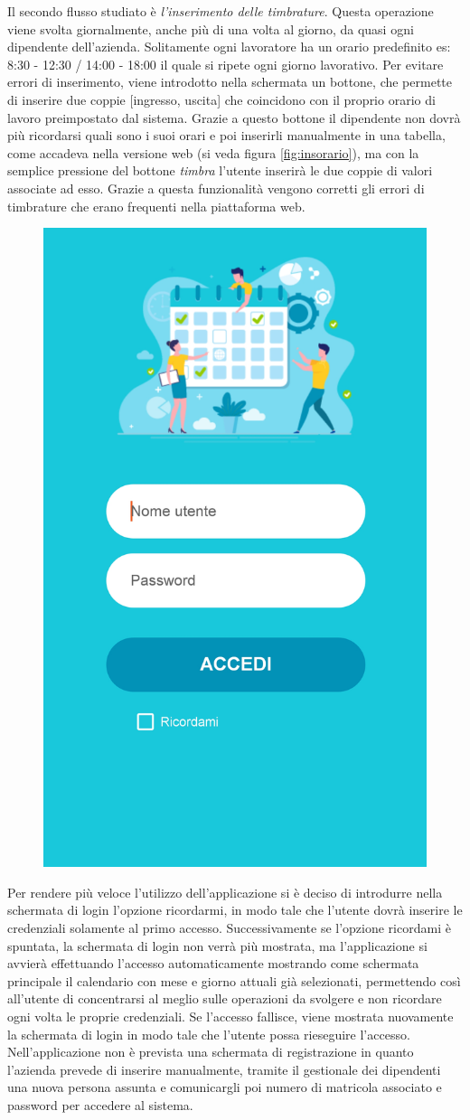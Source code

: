 \documentclass[12pt]{report}
\begin{document}
Il secondo flusso studiato è \textit{l'inserimento delle timbrature}. Questa operazione viene svolta giornalmente, anche più di una volta al giorno, da quasi ogni dipendente dell'azienda. Solitamente ogni lavoratore ha un orario predefinito es: 8:30 - 12:30 / 14:00 - 18:00 il quale si ripete ogni giorno lavorativo. Per evitare errori di inserimento, viene introdotto nella schermata un bottone, che permette di inserire due coppie [ingresso, uscita] che coincidono con il proprio orario di lavoro preimpostato dal sistema. Grazie a questo bottone il dipendente non dovrà più ricordarsi quali sono i suoi orari e poi inserirli manualmente in una tabella, come accadeva nella versione web (si veda figura \ref{fig:insorario}), ma con la semplice pressione del bottone \textit{timbra} l'utente inserirà le due coppie di valori associate ad esso. Grazie a questa funzionalità vengono corretti gli errori di timbrature che erano frequenti nella piattaforma web.


\begin{figure}[!h]
	\centering
	\includegraphics[width=0.3\linewidth]{immagini/login}
	\caption{}
\end{figure}
\newpage
Per rendere più veloce l'utilizzo dell'applicazione si è deciso di introdurre nella schermata di login l'opzione ricordarmi, in modo tale che l'utente dovrà inserire le credenziali solamente al primo accesso. Successivamente se l'opzione ricordami è spuntata, la schermata di login non verrà più mostrata, ma l'applicazione si avvierà effettuando l'accesso automaticamente mostrando come schermata principale il calendario con mese e giorno attuali già selezionati, permettendo così all'utente di concentrarsi al meglio sulle operazioni da svolgere e non ricordare ogni volta le proprie credenziali. Se l'accesso fallisce, viene mostrata nuovamente la schermata di login in modo tale che l'utente possa rieseguire l'accesso. Nell'applicazione non è prevista una schermata di registrazione in quanto l'azienda prevede di inserire manualmente, tramite il gestionale dei dipendenti una nuova persona assunta e comunicargli poi numero di matricola associato e password per accedere al sistema.
\end{document}
